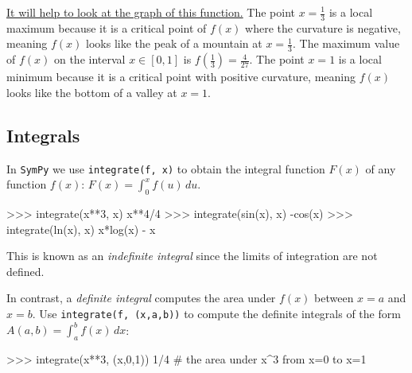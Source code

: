 \noindent
\href{https://www.google.ca/\#q=plot+x**3-2*x**2++\%2B+x&safe=off}{It will help to look at the graph of this function.}
The point $x=\frac{1}{3}$ is a local maximum because it is a critical point of $f(x)$
where the curvature is negative, meaning $f(x)$ looks like the peak of a mountain at $x=\frac{1}{3}$.
The maximum value of $f(x)$ on the interval $x\in [0,1]$ is $f\!\left(\frac{1}{3}\right)=\frac{4}{27}$.
The point $x=1$ is a local minimum because it is a critical point													
with positive curvature, meaning $f(x)$ looks like the bottom of a valley at $x=1$.




\subsection{Integrals}
\label{calculus:integrals}


In \texttt{SymPy} we use \texttt{integrate(f, x)} to obtain the integral function $F(x)$ of any function $f(x)$:					
$F(x) = \int_0^x f(u)\,du$.

\small
\begin{verbatimtab}
>>> integrate(x**3, x)
x**4/4
>>> integrate(sin(x), x)
-cos(x)
>>> integrate(ln(x), x)
x*log(x) - x
\end{verbatimtab}
\normalsize
This is known as an \emph{indefinite integral} since the limits of integration are not defined. 

In contrast, 
a \emph{definite integral} computes the area under $f(x)$ between $x=a$ and $x=b$.
Use \texttt{integrate(f, (x,a,b))} to compute the definite integrals of the form $A(a,b)=\int_a^b f(x) \, dx$:

\small
\begin{verbatimtab}
>>> integrate(x**3, (x,0,1))    
1/4              # the area under x^3 from x=0 to x=1
\end{verbatimtab}
\normalsize

